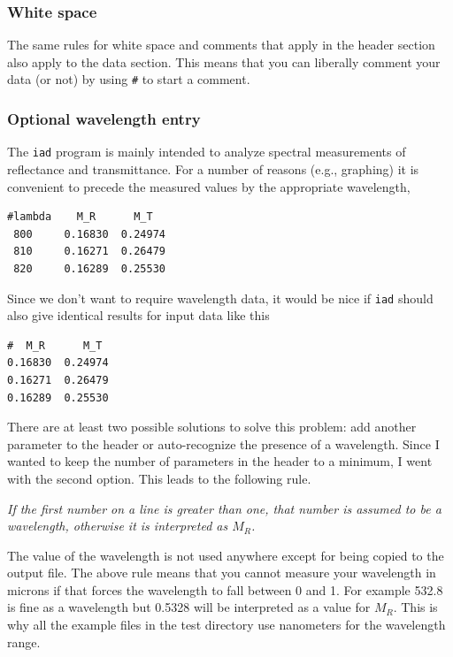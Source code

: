 \documentclass{article}
\newcommand\iadprog{\texttt{iad}}
\begin{document}
\subsubsection{White space}

The same rules for white space and comments that apply in the header section
also apply to the data section.  This means that you can liberally comment your
data (or not) by using \texttt{\#} to start a comment.

\subsubsection{Optional wavelength entry}

The \iadprog{} program is mainly intended to analyze spectral measurements of reflectance
and transmittance.  For a number of reasons (e.g., graphing) it is convenient to 
precede the measured values by the appropriate wavelength,
\begin{center}
\begin{minipage}{4cm}
\scriptsize
\begin{verbatim}
#lambda	   M_R      M_T
 800     0.16830  0.24974
 810     0.16271  0.26479
 820     0.16289  0.25530
\end{verbatim}
\end{minipage}
\end{center}
Since we don't want to require wavelength data, it would be nice if \iadprog{} should also give identical results for input data like this
\begin{center}
\begin{minipage}{3.5cm}
\scriptsize
\begin{verbatim}
#  M_R      M_T
0.16830  0.24974
0.16271  0.26479
0.16289  0.25530
\end{verbatim}
\end{minipage}
\end{center}
There are at least two possible solutions to solve this problem: add another parameter to the header or auto-recognize
the presence of a wavelength.  Since I wanted to keep the number of parameters in the
header to a minimum, I went with the second option.  This leads to the following rule.

\textit{If the first
number on a line is greater than one, that number is assumed to be a wavelength, 
otherwise it is interpreted as $M_R$.}  

The value of the wavelength is not used anywhere
except for being copied to the output file.
The above rule means that you cannot measure your wavelength in microns if that forces
the wavelength to fall between 0 and 1.  For example 532.8 is fine as a wavelength
but 0.5328 will be interpreted as a value for $M_R$.  This is why all the example
files in the test directory use nanometers for the wavelength range.
\end{document}
